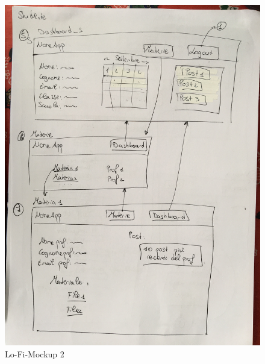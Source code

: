 \documentclass[Lau, binding=0.6cm, oneside]{sapthesis}
\begin{document}
\begin{figure}[H]
	\centering
	\includegraphics[width=1.3\linewidth, angle=-90]{images/mockup_2}
	\caption{Lo-Fi-Mockup 2}
	\label{fig:mockup_2}
\end{figure}
\end{document}
